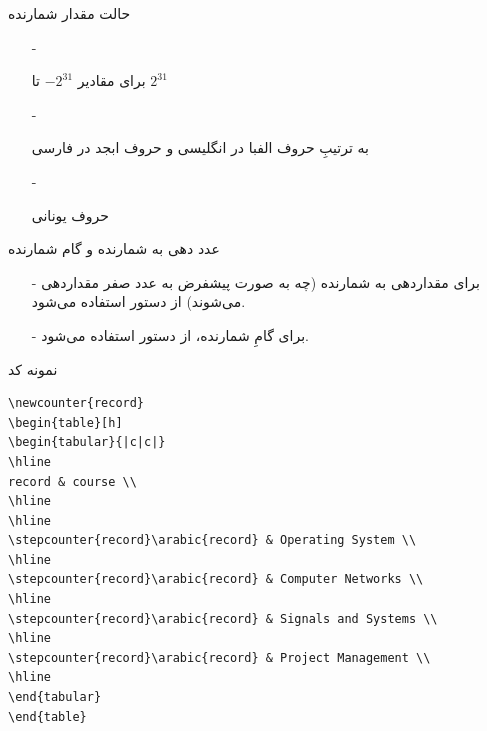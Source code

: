 \begin{frame}{حالت مقدار شمارنده}
\begin{itemize}\itemr
\item[-]

برای مقادیر $-2^{31}$ تا $2^{31}$

\item[-]

به ترتیبِ حروف الفبا در انگلیسی و حروف ابجد در فارسی

\item[-]

حروف یونانی
\end{itemize}
\end{frame}

\begin{frame}{عدد دهی به شمارنده و گام شمارنده}
\begin{itemize}\itemr
\item[-]
برای مقداردهی به شمارنده (چه به صورت پیشفرض به عدد صفر مقداردهی می‌شوند) از دستور 
استفاده می‌شود.

\item[-]
برای گامِ شمارنده، از دستور 
استفاده می‌شود.
\end{itemize}
\end{frame}

\begin{frame}[fragile]{نمونه کد}
\begin{latin}
\begin{lstlisting}[keywords={begin, end}, keywordstyle=\color{Mulberry}\textbf]
\newcounter{record}
\begin{table}[h]
\begin{tabular}{|c|c|}
\hline
record & course \\
\hline
\hline
\stepcounter{record}\arabic{record} & Operating System \\
\hline
\stepcounter{record}\arabic{record} & Computer Networks \\
\hline
\stepcounter{record}\arabic{record} & Signals and Systems \\
\hline
\stepcounter{record}\arabic{record} & Project Management \\
\hline
\end{tabular}
\end{table}
\end{lstlisting}
\end{latin}
\end{frame}

